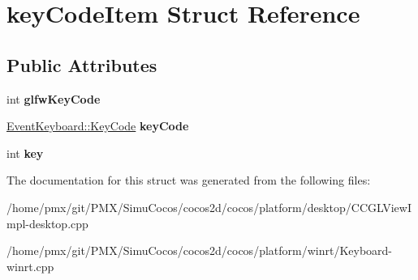 \hypertarget{structkeyCodeItem}{}\section{key\+Code\+Item Struct Reference}
\label{structkeyCodeItem}
\subsection*{Public Attributes}
\begin{DoxyCompactItemize}
\item 
\mbox{\label{structkeyCodeItem_a0612c421c3b6b390d5ff9c0e9bde53fc}} 
int {\bfseries glfw\+Key\+Code}
\item 
\mbox{\label{structkeyCodeItem_a539be9ddf6a48210aee0491145b5af3b}} 
\hyperlink{classEventKeyboard_a7cd3fa46515673276ce8ec7f0e051606}{Event\+Keyboard\+::\+Key\+Code} {\bfseries key\+Code}
\item 
\mbox{\label{structkeyCodeItem_a8a95e7a09a2bdd6330ed33936b068a3a}} 
int {\bfseries key}
\end{DoxyCompactItemize}


The documentation for this struct was generated from the following files\+:\begin{DoxyCompactItemize}
\item 
/home/pmx/git/\+P\+M\+X/\+Simu\+Cocos/cocos2d/cocos/platform/desktop/C\+C\+G\+L\+View\+Impl-\/desktop.\+cpp\item 
/home/pmx/git/\+P\+M\+X/\+Simu\+Cocos/cocos2d/cocos/platform/winrt/Keyboard-\/winrt.\+cpp\end{DoxyCompactItemize}
